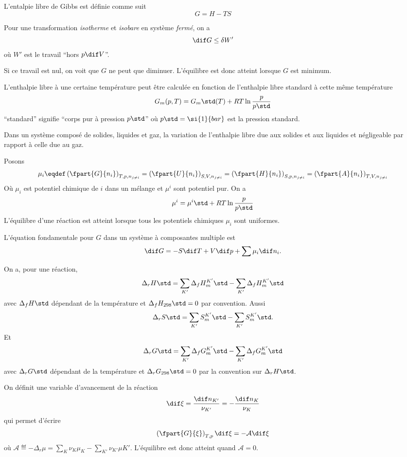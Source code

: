 L'entalpie libre de Gibbs est définie comme suit
\[ G = H - TS \]

Pour une transformation \emph{isotherme} et \emph{isobare}
en système \emph{fermé}, on a
\begin{equation}
  \label{eq:dGdW}
  \dif G \leq \delta W'
\end{equation}
où $W'$ est le travail ``hors $p\dif V$''.

Si ce travail est nul, on voit que $G$ ne peut que diminuer.
L'équilibre est donc atteint lorsque $G$ est minimum.

L'enthalpie libre à une certaine température peut être calculée
en fonction de l'enthalpie libre standard à cette même température
\[ G_m(p, T) = G_m\std(T) + RT \ln \frac{p}{p\std} \]
``standard'' signifie ``corps pur à pression $p\std$'' où
$p\std = \si{1}{bar}$ est la pression standard.

Dans un système composé de solides, liquides et gaz, la variation
de l'enthalpie libre due aux solides et aux liquides et négligeable par
rapport à celle due au gaz.

Posons
\[ \mu_i \eqdef \left(\fpart{G}{n_i}\right)_{T,p,n_{j\neq i}} =
\left(\fpart{U}{n_i}\right)_{S,V,n_{j\neq i}} =
\left(\fpart{H}{n_i}\right)_{S,p,n_{j\neq i}} =
\left(\fpart{A}{n_i}\right)_{T,V,n_{j\neq i}} \]
Où $\mu_i$ est potentiel chimique de $i$ dans un mélange
et $\mu^i$ sont potentiel pur.
On a
\[ \mu^i = {\mu^i}\std + RT \ln\frac{p}{p\std} \]
L'équilibre d'une réaction est atteint lorsque tous les potentiels
chimiques $\mu_i$ sont uniformes.

L'équation fondamentale pour $G$ dans un système à composantes
multiple est
\[ \dif G = -S\dif T + V\dif p + \sum \mu_i \dif n_i. \]

On a, pour une réaction,
\[ \Delta_r H\std =
\sum_{K'}\Delta_f{H_m^{K'}}\std - \sum_{K'}\Delta_f{H_m^{K'}}\std \]
avec $\Delta_f H\std$ dépendant de la température et
$\Delta_f H_{298}\std = 0$ par convention.
Aussi
\[ \Delta_r S\std =
\sum_{K'}{S_m^{K'}}\std - \sum_{K'}{S_m^{K'}}\std. \]
Et
\[ \Delta_r G\std =
\sum_{K'}\Delta_f{G_m^{K'}}\std - \sum_{K'}\Delta_f{G_m^{K'}}\std \]
avec $\Delta_r G\std$ dépendant de la température et
$\Delta_r G_{298}\std = 0$ par la convention sur $\Delta_r H\std$.

On définit une variable d'avancement de la réaction
\[ \dif \xi = \frac{\dif n_{K'}}{\nu_{K'}} = -\frac{\dif n_K}{\nu_K} \]
qui permet d'écrire
\[ \left(\fpart{G}{\xi}\right)_{T,p}\dif \xi = -\mathcal{A}\dif \xi \]
où $\mathcal{A} \eqdef
-\Delta_r \mu = \sum_K \nu_K\mu_K - \sum_{K'}\nu_{K'}\mu{K'}$.
L'équilibre est donc atteint quand $\mathcal{A} = 0$.


